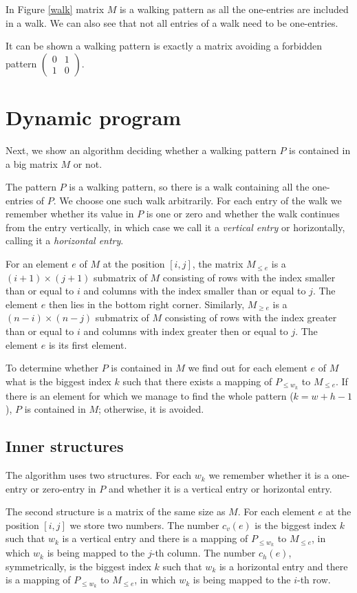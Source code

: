 In Figure \ref{walk} matrix $M$ is a walking pattern as all the one-entries are included in a walk. We can also see that not all entries of a walk need to be one-entries.

It can be shown a walking pattern is exactly a matrix avoiding a forbidden pattern $\left(\begin{smallmatrix}
0 & 1 \\
1 & 0
\end{smallmatrix}\right)$.

\section{Dynamic program}
Next, we show an algorithm deciding whether a walking pattern $P$ is contained in a big matrix $M$ or not.

The pattern $P$ is a walking pattern, so there is a walk containing all the one-entries of $P$. We choose one such walk arbitrarily. For each entry of the walk we remember whether its value in $P$ is one or zero and whether the walk continues from the entry vertically, in which case we call it a \emph{vertical entry} or horizontally, calling it a \emph{horizontal entry}.
\begin{defn}
For an element $e$ of $M$ at the position $[i,j]$, the matrix $M_{\leq e}$ is a $(i+1)\times(j+1)$ submatrix of $M$ consisting of rows with the index smaller than or equal to $i$ and columns with the index smaller than or equal to $j$. The element $e$ then lies in the bottom right corner. Similarly, $M_{\geq e}$ is a $(n-i)\times(n-j)$ submatrix of $M$ consisting of rows with the index greater than or equal to $i$ and columns with index greater then or equal to $j$. The element $e$ is its first element.
\end{defn}
To determine whether $P$ is contained in $M$ we find out for each element $e$ of $M$ what is the biggest index $k$ such that there exists a mapping of $P_{\leq w_k}$ to $M_{\leq e}$. If there is an element for which we manage to find the whole pattern ($k=w+h-1$), $P$ is contained in $M$; otherwise, it is avoided.

\subsection{Inner structures}
The algorithm uses two structures. For each $w_k$ we remember whether it is a one-entry or zero-entry in $P$ and whether it is a vertical entry or horizontal entry.

The second structure is a matrix of the same size as $M$. For each element $e$ at the position $[i,j]$ we store two numbers. The number $c_v(e)$ is the biggest index $k$ such that $w_k$ is a vertical entry and there is a mapping of $P_{\leq w_k}$ to $M_{\leq e}$, in which $w_k$ is being mapped to the $j$-th column. The number $c_h(e)$, symmetrically, is the biggest index $k$ such that $w_k$ is a horizontal entry and there is a mapping of $P_{\leq w_k}$ to $M_{\leq e}$, in which $w_k$ is being mapped to the $i$-th row.

